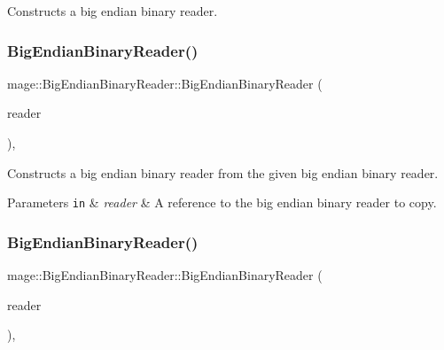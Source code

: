 Constructs a big endian binary reader. \hypertarget{classmage_1_1_big_endian_binary_reader_a9d490263268290217ae4f2f06e0699c4}{}\label{classmage_1_1_big_endian_binary_reader_a9d490263268290217ae4f2f06e0699c4} 
\subsubsection{\texorpdfstring{Big\+Endian\+Binary\+Reader()}{BigEndianBinaryReader()}\hspace{0.1cm}{\footnotesize\ttfamily [2/3]}}
{\footnotesize\ttfamily mage\+::\+Big\+Endian\+Binary\+Reader\+::\+Big\+Endian\+Binary\+Reader (\begin{DoxyParamCaption}\item[{const \hyperlink{classmage_1_1_big_endian_binary_reader}{Big\+Endian\+Binary\+Reader} \&}]{reader }\end{DoxyParamCaption})\hspace{0.3cm}{\ttfamily [protected]}, {\ttfamily [delete]}}

Constructs a big endian binary reader from the given big endian binary reader.


\begin{DoxyParams}[1]{Parameters}
\mbox{\tt in}  & {\em reader} & A reference to the big endian binary reader to copy. \\
\hline
\end{DoxyParams}
\hypertarget{classmage_1_1_big_endian_binary_reader_a3cb2fbd205854cf69c36054a2003e80e}{}\label{classmage_1_1_big_endian_binary_reader_a3cb2fbd205854cf69c36054a2003e80e} 
\subsubsection{\texorpdfstring{Big\+Endian\+Binary\+Reader()}{BigEndianBinaryReader()}\hspace{0.1cm}{\footnotesize\ttfamily [3/3]}}
{\footnotesize\ttfamily mage\+::\+Big\+Endian\+Binary\+Reader\+::\+Big\+Endian\+Binary\+Reader (\begin{DoxyParamCaption}\item[{\hyperlink{classmage_1_1_big_endian_binary_reader}{Big\+Endian\+Binary\+Reader} \&\&}]{reader }\end{DoxyParamCaption})\hspace{0.3cm}{\ttfamily [protected]}, {\ttfamily [default]}}


